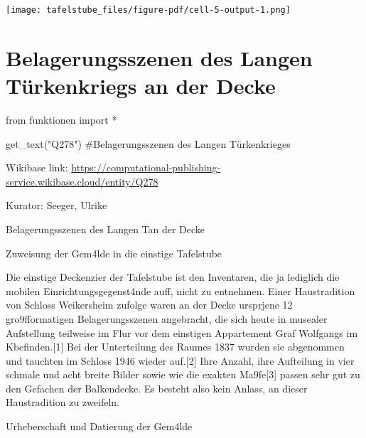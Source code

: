 \documentclass[
  letterpaper,
]{book}
\newenvironment{Shaded}{\begin{snugshade}}{\end{snugshade}}
\newcommand{\CommentTok}[1]{\textcolor[rgb]{0.37,0.37,0.37}{#1}}
\newcommand{\ImportTok}[1]{\textcolor[rgb]{0.00,0.46,0.62}{#1}}
\newcommand{\NormalTok}[1]{\textcolor[rgb]{0.00,0.23,0.31}{#1}}
\newcommand{\OperatorTok}[1]{\textcolor[rgb]{0.37,0.37,0.37}{#1}}
\newcommand{\StringTok}[1]{\textcolor[rgb]{0.13,0.47,0.30}{#1}}
\begin{document}
\texttt{[image: tafelstube\_files/figure-pdf/cell-5-output-1.png]}


\chapter{Belagerungsszenen des Langen Türkenkriegs an der
Decke}\label{belagerungsszenen-des-langen-tuxfcrkenkriegs-an-der-decke}

\begin{Shaded}
\begin{Highlighting}[]
\ImportTok{from}\NormalTok{ funktionen }\ImportTok{import} \OperatorTok{*}
\end{Highlighting}
\end{Shaded}

\begin{Shaded}
\begin{Highlighting}[]
\NormalTok{get\_text(}\StringTok{"Q278"}\NormalTok{)}
\CommentTok{\#Belagerungsszenen des Langen Türkenkrieges}
\end{Highlighting}
\end{Shaded}

Wikibase link:
\url{https://computational-publishing-service.wikibase.cloud/entity/Q278}

Kurator: Seeger, Ulrike

Belagerungsszenen des Langen T\xbcrkenkriegs an der Decke

Zuweisung der Gem\xa4lde in die einstige Tafelstube

Die einstige Deckenzier der Tafelstube ist den Inventaren, die ja
lediglich die mobilen Einrichtungsgegenst\xa4nde auff\xbchren,
nicht zu entnehmen. Einer Haustradition von Schloss Weikersheim zufolge
waren an der Decke urspr\xbcnglich jene 12 gro\x9fformatigen
Belagerungsszenen angebracht, die sich heute in musealer Aufstellung
teilweise im Flur vor dem einstigen Appartement Graf Wolfgangs im
K\xbcchenbau befinden.{[}1{]} Bei der Unterteilung des Raumes 1837
wurden sie abgenommen und tauchten im Schloss 1946 wieder auf.{[}2{]}
Ihre Anzahl, ihre Aufteilung in vier schmale und acht breite Bilder
sowie wie die exakten Ma\x9fe{[}3{]} passen sehr gut zu den Gefachen
der Balkendecke. Es besteht also kein Anlass, an dieser Haustradition zu
zweifeln.

Urheberschaft und Datierung der Gem\xa4lde
\end{document}
